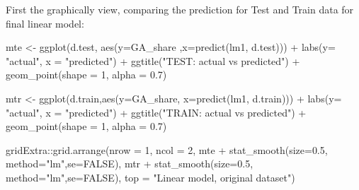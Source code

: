 \documentclass[
]{article}
\newenvironment{Shaded}{\begin{snugshade}}{\end{snugshade}}
\newcommand{\AttributeTok}[1]{\textcolor[rgb]{0.77,0.63,0.00}{#1}}
\newcommand{\ConstantTok}[1]{\textcolor[rgb]{0.00,0.00,0.00}{#1}}
\newcommand{\DecValTok}[1]{\textcolor[rgb]{0.00,0.00,0.81}{#1}}
\newcommand{\FloatTok}[1]{\textcolor[rgb]{0.00,0.00,0.81}{#1}}
\newcommand{\FunctionTok}[1]{\textcolor[rgb]{0.00,0.00,0.00}{#1}}
\newcommand{\NormalTok}[1]{#1}
\newcommand{\OtherTok}[1]{\textcolor[rgb]{0.56,0.35,0.01}{#1}}
\newcommand{\SpecialCharTok}[1]{\textcolor[rgb]{0.00,0.00,0.00}{#1}}
\newcommand{\StringTok}[1]{\textcolor[rgb]{0.31,0.60,0.02}{#1}}
\begin{document}
First the graphically view, comparing the prediction for Test and Train
data for final linear model:

\begin{Shaded}
\begin{Highlighting}[]
\NormalTok{mte }\OtherTok{\textless{}{-}} \FunctionTok{ggplot}\NormalTok{(d.test, }\FunctionTok{aes}\NormalTok{(}\AttributeTok{y=}\NormalTok{GA\_share ,}\AttributeTok{x=}\FunctionTok{predict}\NormalTok{(lm1, d.test))) }\SpecialCharTok{+}
  \FunctionTok{labs}\NormalTok{(}\AttributeTok{y=} \StringTok{"actual"}\NormalTok{, }\AttributeTok{x =} \StringTok{"predicted"}\NormalTok{) }\SpecialCharTok{+} \FunctionTok{ggtitle}\NormalTok{(}\StringTok{"TEST: actual vs predicted"}\NormalTok{) }\SpecialCharTok{+} 
  \FunctionTok{geom\_point}\NormalTok{(}\AttributeTok{shape =} \DecValTok{1}\NormalTok{, }\AttributeTok{alpha =} \FloatTok{0.7}\NormalTok{)}

\NormalTok{mtr }\OtherTok{\textless{}{-}} \FunctionTok{ggplot}\NormalTok{(d.train,}\FunctionTok{aes}\NormalTok{(}\AttributeTok{y=}\NormalTok{GA\_share, }\AttributeTok{x=}\FunctionTok{predict}\NormalTok{(lm1, d.train))) }\SpecialCharTok{+}
  \FunctionTok{labs}\NormalTok{(}\AttributeTok{y=} \StringTok{"actual"}\NormalTok{, }\AttributeTok{x =} \StringTok{"predicted"}\NormalTok{) }\SpecialCharTok{+} \FunctionTok{ggtitle}\NormalTok{(}\StringTok{"TRAIN: actual vs predicted"}\NormalTok{) }\SpecialCharTok{+} 
  \FunctionTok{geom\_point}\NormalTok{(}\AttributeTok{shape =} \DecValTok{1}\NormalTok{, }\AttributeTok{alpha =} \FloatTok{0.7}\NormalTok{)}

\NormalTok{gridExtra}\SpecialCharTok{::}\FunctionTok{grid.arrange}\NormalTok{(}\AttributeTok{nrow =} \DecValTok{1}\NormalTok{, }\AttributeTok{ncol =} \DecValTok{2}\NormalTok{, mte }\SpecialCharTok{+} 
                        \FunctionTok{stat\_smooth}\NormalTok{(}\AttributeTok{size=}\FloatTok{0.5}\NormalTok{, }\AttributeTok{method=}\StringTok{"lm"}\NormalTok{,}\AttributeTok{se=}\ConstantTok{FALSE}\NormalTok{), }
\NormalTok{                        mtr }\SpecialCharTok{+} \FunctionTok{stat\_smooth}\NormalTok{(}\AttributeTok{size=}\FloatTok{0.5}\NormalTok{, }\AttributeTok{method=}\StringTok{"lm"}\NormalTok{,}\AttributeTok{se=}\ConstantTok{FALSE}\NormalTok{),}
                        \AttributeTok{top =} \StringTok{"Linear model, original dataset"}\NormalTok{)}
\end{Highlighting}
\end{Shaded}
\end{document}
